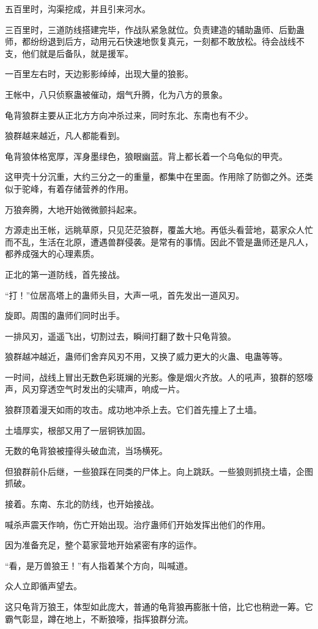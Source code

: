 \begin{this_body}
五百里时，沟渠挖成，并且引来河水。

三百里时，三道防线搭建完毕，作战队紧急就位。负责建造的辅助蛊师、后勤蛊师，都纷纷退到后方，动用元石快速地恢复真元，一刻都不敢放松。待会战线不支，他们就是后备队，就是援军。

一百里左右时，天边影影绰绰，出现大量的狼影。

王帐中，八只侦察蛊被催动，烟气升腾，化为八方的景象。

龟背狼群主要从正北方方向冲杀过来，同时东北、东南也有不少。

狼群越来越近，凡人都能看到。

龟背狼体格宽厚，浑身墨绿色，狼眼幽蓝。背上都长着一个乌龟似的甲壳。

这甲壳十分沉重，大约三分之一的重量，都集中在里面。作用除了防御之外。还类似于驼峰，有着存储营养的作用。

万狼奔腾，大地开始微微颤抖起来。

方源走出王帐，远眺草原，只见茫茫狼群，覆盖大地。再低头看营地，葛家众人忙而不乱，生活在北原，遭遇兽群侵袭。是常有的事情。因此不管是蛊师还是凡人，都养成强大的心理素质。

正北的第一道防线，首先接战。

“打！”位居高塔上的蛊师头目，大声一吼，首先发出一道风刃。

旋即。周围的蛊师们同时出手。

一排风刃，遥遥飞出，切割过去，瞬间打翻了数十只龟背狼。

狼群越冲越近，蛊师们舍弃风刃不用，又换了威力更大的火蛊、电蛊等等。

一时间，战线上冒出无数色彩斑斓的光影。像是烟火齐放。人的吼声，狼群的怒嚎声，风刃穿透空气时发出的尖啸声，响成一片。

狼群顶着漫天如雨的攻击。成功地冲杀上去。它们首先撞上了土墙。

土墙厚实，根部又用了一层铜铁加固。

无数的龟背狼被撞得头破血流，当场横死。

但狼群前仆后继，一些狼踩在同类的尸体上。向上跳跃。一些狼则抓挠土墙，企图抓破。

接着。东南、东北的防线，也开始接战。

喊杀声震天作响，伤亡开始出现。治疗蛊师们开始发挥出他们的作用。

因为准备充足，整个葛家营地开始紧密有序的运作。

“看，是万兽狼王！”有人指着某个方向，叫喊道。

众人立即循声望去。

这只龟背万狼王，体型如此庞大，普通的龟背狼再膨胀十倍，比它也稍逊一筹。它霸气彰显，蹲在地上，不断狼嚎，指挥狼群分流。


\end{this_body}
